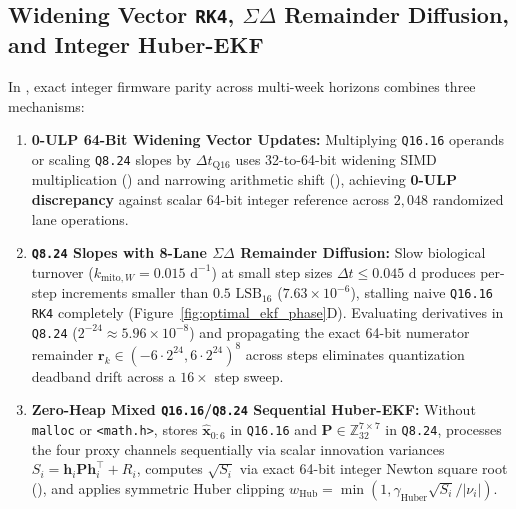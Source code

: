\documentclass[11pt]{article}
\theoremstyle{plain}
\theoremstyle{remark}
\begin{document}
\subsection{Widening Vector \texttt{RK4}, $\Sigma\Delta$ Remainder Diffusion, and Integer Huber-EKF}
In , exact integer firmware parity across multi-week horizons combines three mechanisms:
\begin{enumerate}
  \item \textbf{0-ULP 64-Bit Widening Vector Updates:} Multiplying \texttt{Q16.16} operands or scaling \texttt{Q8.24} slopes by $\Delta t_{\mathrm{Q16}}$ uses 32-to-64-bit widening SIMD multiplication () and narrowing arithmetic shift (), achieving \textbf{0-ULP discrepancy} against scalar 64-bit integer reference across $2{,}048$ randomized lane operations.
  \item \textbf{\texttt{Q8.24} Slopes with 8-Lane $\Sigma\Delta$ Remainder Diffusion:} Slow biological turnover ($k_{\mathrm{mito},W} = 0.015\text{ d}^{-1}$) at small step sizes $\Delta t \le 0.045\text{ d}$ produces per-step increments smaller than $0.5\text{ LSB}_{16}$ ($7.63 \times 10^{-6}$), stalling naive \texttt{Q16.16} \texttt{RK4} completely (Figure~\ref{fig:optimal_ekf_phase}D). Evaluating derivatives in \texttt{Q8.24} ($2^{-24} \approx 5.96 \times 10^{-8}$) and propagating the exact 64-bit numerator remainder $\mathbf{r}_k \in (-6\cdot 2^{24}, 6\cdot 2^{24})^8$ across steps eliminates quantization deadband drift across a $16\times$ step sweep.
  \item \textbf{Zero-Heap Mixed \texttt{Q16.16}/\texttt{Q8.24} Sequential Huber-EKF:} Without \texttt{malloc} or \texttt{<math.h>},  stores $\hat{\mathbf{x}}_{0:6}$ in \texttt{Q16.16} and $\mathbf{P} \in \mathbb{Z}_{32}^{7\times 7}$ in \texttt{Q8.24}, processes the four proxy channels sequentially via scalar innovation variances $S_i = \mathbf{h}_i\mathbf{P}\mathbf{h}_i^\top + R_i$, computes $\sqrt{S_i}$ via exact 64-bit integer Newton square root (), and applies symmetric Huber clipping $w_{\mathrm{Hub}} = \min(1, \gamma_{\mathrm{Huber}}\sqrt{S_i}/|\nu_i|)$.
\end{enumerate}
\end{document}
